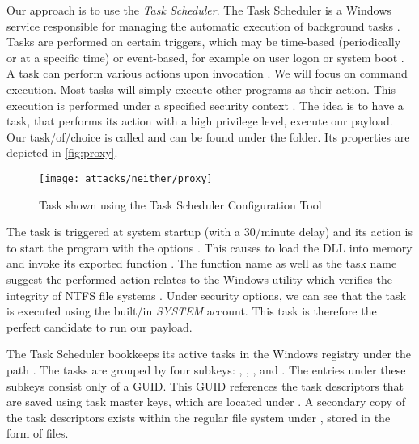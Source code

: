 Our approach is to use the \emph{Task Scheduler}.
The Task Scheduler is a Windows service responsible for managing the automatic execution of background tasks \cite[Section 10]{windows-internals-7-part2}.
Tasks are performed on certain triggers, which may be time-based (periodically or at a specific time) or event-based, for example on user logon or system boot \cite{microsoft-task-scheduler-triggers}.
A task can perform various actions upon invocation \cite{microsoft-task-scheduler-actions}.
We will focus on command execution.
Most tasks will simply execute other programs as their action.
This execution is performed under a specified security context \cite{microsoft-task-scheduler-security-contexts}.
The idea is to have a task, that performs its action with a high privilege level, execute our payload.
Our task\-/of\-/choice is called  and can be found under the  folder.
Its properties are depicted in \autoref{fig:proxy}.

\begin{figure}[htb]
    \centering
    \texttt{[image: attacks/neither/proxy]}
    \caption{ Task shown using the Task Scheduler Configuration Tool}
    \label{fig:proxy}
\end{figure}

The  task is triggered at system startup (with a 30\-/minute delay) and its action is to start the program  with the options .
This causes  to load the  \ac{DLL} into memory and invoke its exported function  \cite{microsoft-rundll32}.
The function name as well as the task name suggest the performed action relates to the Windows utility  which verifies the integrity of \ac{NTFS} file systems \cite{microsoft-autochk}.
Under security options, we can see that the task is executed using the built\-/in \emph{SYSTEM} account.
This task is therefore the perfect candidate to run our payload.

The Task Scheduler bookkeeps its active tasks in the Windows registry under the path .
The tasks are grouped by four subkeys: , , , and .
The entries under these subkeys consist only of a \ac{GUID}.
This \ac{GUID} references the task descriptors that are saved using task master keys, which are located under  \cite[Section 10]{windows-internals-7-part2}.
A secondary copy of the task descriptors exists within the regular file system under , stored in the form of  files.

